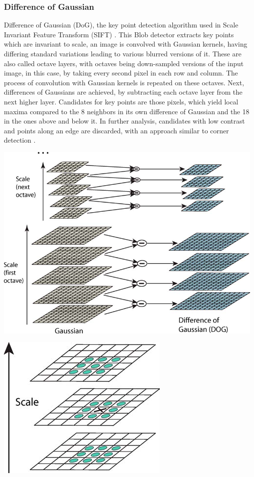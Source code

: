 \documentclass[Bachelorarbeit.tex]{subfiles}
\begin{document}
\subsubsection{Difference of Gaussian}
Difference of Gaussian (DoG), the key point detection algorithm used in Scale Invariant Feature Transform (SIFT) \cite{lowe2004distinctive}. This Blob detector extracts key points which are invariant to scale, an image is convolved with Gaussian kernels, having differing standard variations leading to various blurred versions of it. These are also called octave layers, with octaves being down-sampled versions of the input image, in this case, by taking every second pixel in each row and column. The process of convolution with Gaussian kernels is repeated on these octaves. Next, differences of Gaussians are achieved, by subtracting each octave layer from the next higher layer. Candidates for key points are those pixels, which yield local maxima compared to the 8 neighbors in its own difference of Gaussian and the 18 in the ones above and below it. In further analysis, candidates with low contrast and points along an edge are discarded, with an approach similar to corner detection \citep[pp. 94-98]{lowe2004distinctive}. 
\begin{center}
	\includegraphics[width=0.7\linewidth]{Images/dog}
	\label{dog}
\end{center}
\begin{center}
	\includegraphics[width=0.4\linewidth]{Images/dog2}
\end{center}
	
\end{document}
